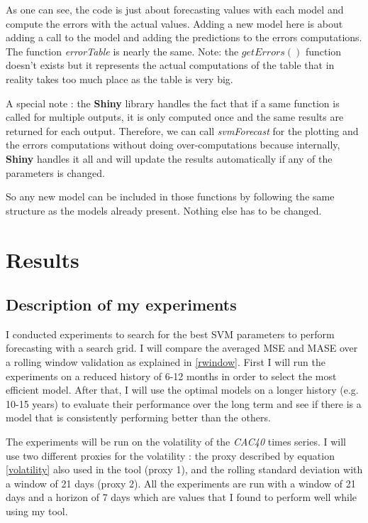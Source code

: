 \documentclass[11pt,a4paper,oneside]{book}
\begin{document}
As one can see, the code is just about forecasting values with each model and compute the errors with the actual values. Adding a new model here is about adding a call to the model and adding the predictions to the errors computations. The function \textit{errorTable} is nearly the same. Note: the $getErrors()$ function doesn't exists but it represents the actual computations of the table that in reality takes too much place as the table is very big. 

A special note : the \textbf{Shiny} library handles the fact that if a same function is called for multiple outputs, it is only computed once and the same results are returned for each output. Therefore, we can call \textit{svmForecast} for the plotting and the errors computations without doing over-computations because internally, \textbf{Shiny} handles it all and will update the results automatically if any of the parameters is changed.

So any new model can be included in those functions by following the same structure as the models already present. Nothing else has to be changed.


\chapter{Results}

\section{Description of my experiments}

I conducted experiments to search for the best SVM parameters to perform forecasting with a search grid. I will compare the averaged MSE and MASE over a rolling window validation as explained in \ref{rwindow}. First I will run the experiments on a reduced history of 6-12 months in order to select the most efficient model. After that, I will use the optimal models on a longer history (e.g. 10-15 years) to evaluate their performance over the long term and see if there is a model that is consistently performing better than the others. 

The experiments will be run on the volatility of the \textit{CAC40} times series. I will use two different proxies for the volatility : the proxy described by equation \ref{volatility} also used in the tool (proxy 1), and the rolling standard deviation with a window of 21 days (proxy 2). All the experiments are run with a window of 21 days and a horizon of 7 days which are values that I found to perform well while using my tool.
\end{document}
